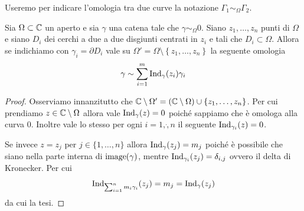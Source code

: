 \begin{remark}
  Useremo per indicare l'omologia tra due curve la notazione
  $\Gamma_1 \sim_\Omega \Gamma_2$.
  \label{rmk:notazione-omologia-catene}
\end{remark}

\begin{proposition}
    \label{prop:decomposizione-curva-in-catena-con-n-punti}
    Sia $\Omega \subset \mathbb{C}$ un aperto e sia $\gamma$ una catena tale che
    $\gamma \sim_\Omega 0$. Siano $z_1, \dots, z_n$ punti di $\Omega$
    e siano $D_i$ dei cerchi a due a due disgiunti centrati in $z_i$ e tali
    che $D_i \subset \Omega$. Allora se indichiamo con $\gamma_i = \partial
    D_i$ vale su $\Omega' = \Omega \setminus \left\{z_1,\dots, z_n\right\}$ la
    seguente omologia
    \begin{equation*}
      \gamma \sim \sum^m_{i=1} \operatorname{Ind}_\gamma(z_i) \gamma_i
    \end{equation*}
\end{proposition}
\begin{proof}
     Osserviamo innanzitutto che $\mathbb{C} \setminus \Omega' = (\mathbb{C} \setminus
     \Omega) \cup \{z_1, \dots, z_n\}$. Per cui prendiamo $z\in \mathbb{C} \setminus
     \Omega$ allora vale $\operatorname{Ind}_\gamma(z) = 0$ poiché sappiamo
     che è omologa alla curva $0$. Inoltre vale lo stesso per ogni $i
     = 1,\dot, n$ il seguente $\operatorname{Ind}_{\gamma_i}(z) = 0$. 

     Se invece $z = z_j$ per $j \in \{1, \dots, n\}$ allora
     $\operatorname{Ind}_\gamma(z_j) = m_j$ poiché è possibile che siano 
     nella parte interna di $\operatorname{image}(\gamma)$, mentre
     $\operatorname{Ind}_{\gamma_i}(z_j) = \delta_{i,j}$ ovvero il delta di
     Kronecker. Per cui 
     \begin{equation*}
       \operatorname{Ind}_{\sum^n_{i=1} m_i \gamma_i}(z_j) = m_j
       = \operatorname{Ind}_\gamma(z_j) 
     \end{equation*}
    da cui la tesi.
 \end{proof}

